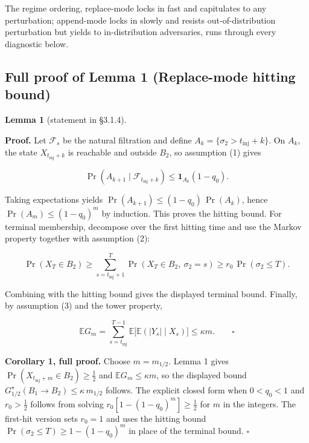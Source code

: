 \documentclass{article}
\theoremstyle{plain}
\theoremstyle{definition}
\begin{document}
The regime ordering, replace-mode locks in fast and capitulates
to any perturbation; append-mode locks in slowly and resists
out-of-distribution perturbation but yields to in-distribution
adversaries, runs through every diagnostic below.

\subsection{Full proof of Lemma 1 (Replace-mode hitting bound)}

\textbf{Lemma 1} (statement in §3.1.4).

\textbf{Proof.} Let $\mathcal{F}_s$ be the natural filtration and define
$A_k = \{\sigma_2 > t_{\mathrm{inj}} + k\}$. On $A_k$, the state
$X_{t_{\mathrm{inj}}+k}$ is reachable and outside $B_2$, so assumption
(1) gives

\begin{equation*}
\Pr(A_{k+1} \mid \mathcal{F}_{t_{\mathrm{inj}}+k})
\le \mathbf{1}_{A_k} (1 - q_0).
\end{equation*}

Taking expectations yields $\Pr(A_{k+1}) \le (1 - q_0)\,\Pr(A_k)$,
hence $\Pr(A_m) \le (1 - q_0)^m$ by induction. This proves the
hitting bound. For terminal membership, decompose over the first
hitting time and use the Markov property together with assumption (2):

\begin{equation*}
\Pr(X_T \in B_2)
\ge \sum_{s = t_{\mathrm{inj}}+1}^{T}
\Pr(X_T \in B_2,\ \sigma_2 = s)
\ge r_0 \, \Pr(\sigma_2 \le T) .
\end{equation*}

Combining with the hitting bound gives the displayed terminal bound.
Finally, by assumption (3) and the tower property,

\begin{equation*}
\mathbb{E} G_m
= \sum_{s = t_{\mathrm{inj}}}^{T-1}
\mathbb{E}\bigl[\mathbb{E}(|Y_s| \mid X_s)\bigr]
\le \kappa m . \qquad \square
\end{equation*}

\textbf{Corollary 1, full proof.} Choose $m = m_{1/2}$. Lemma 1 gives
$\Pr(X_{t_{\mathrm{inj}}+m} \in B_2) \ge \tfrac{1}{2}$ and
$\mathbb{E} G_m \le \kappa m$, so the displayed bound
$G^\star_{1/2}(B_1 \to B_2) \le \kappa\, m_{1/2}$ follows. The
explicit closed form when $0 < q_0 < 1$ and $r_0 > \tfrac{1}{2}$
follows from solving $r_0 [1 - (1-q_0)^m] \ge \tfrac{1}{2}$ for $m$
in the integers. The first-hit version sets $r_0 = 1$ and uses the
hitting bound $\Pr(\sigma_2 \le T) \ge 1 - (1-q_0)^m$ in place of
the terminal bound. $\square$
\end{document}
